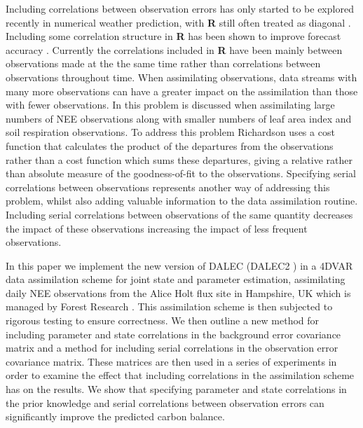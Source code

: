 \documentclass[11pt]{article}
\begin{document}
Including correlations between observation errors has only started to be explored recently in numerical weather prediction, with \textbf{R} still often treated as diagonal \citep{Stewart2013}. Including some correlation structure in \textbf{R} has been shown to improve forecast accuracy \citep{weston2014accounting}. Currently the correlations included in \textbf{R} have been mainly between observations made at the the same time rather than correlations between observations throughout time. When assimilating observations, data streams with many more observations can have a greater impact on the assimilation than those with fewer observations. In \citet{richardson2010estimating} this problem is discussed when assimilating large numbers of NEE observations along with smaller numbers of leaf area index and soil respiration observations. To address this problem Richardson uses a cost function that calculates the product of the departures from the observations rather than a cost function which sums these departures, giving a relative rather than absolute measure of the goodness-of-fit to the observations. Specifying serial correlations between observations represents another way of addressing this problem, whilst also adding valuable information to the data assimilation routine. Including serial correlations between observations of the same quantity decreases the impact of these observations \citep{jarvinen1999variational} increasing the impact of less frequent observations. 

In this paper we implement the new version of DALEC (DALEC2 \citep{Bloom2015}) in a 4DVAR data assimilation scheme for joint state and parameter estimation, assimilating daily NEE observations from the Alice Holt flux site in Hampshire, UK which is managed by Forest Research \citep{wilkinson2012inter}. This assimilation scheme is then subjected to rigorous testing to ensure correctness. We then outline a new method for including parameter and state correlations in the background error covariance matrix and a method for including serial correlations in the observation error covariance matrix. These matrices are then used in a series of experiments in order to examine the effect that including correlations in the assimilation scheme has on the results. We show that specifying parameter and state correlations in the prior knowledge and serial correlations between observation errors can significantly improve the predicted carbon balance.
\end{document}
